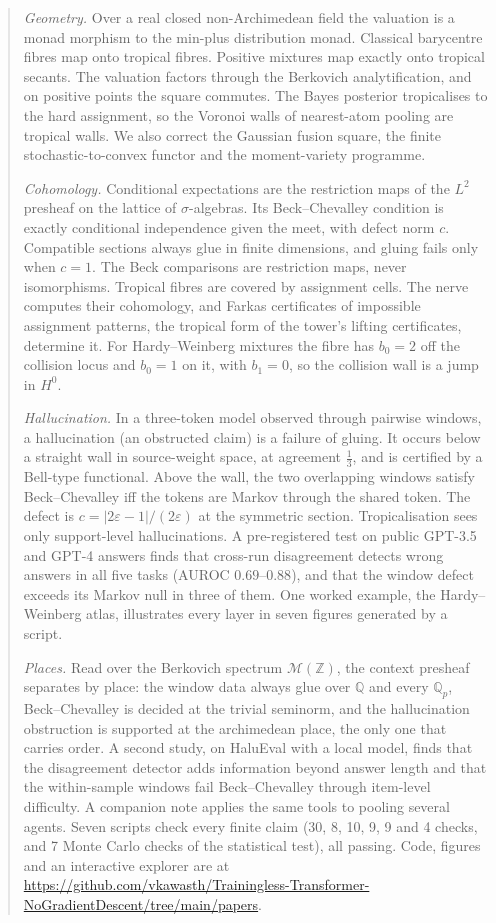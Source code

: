 \documentclass[11pt]{article}
\theoremstyle{definition}
\begin{document}
\begin{abstract}
\emph{Geometry.} Over a real closed non-Archimedean field the valuation is a monad morphism to the min-plus distribution monad.
Classical barycentre fibres map onto tropical fibres. Positive mixtures map exactly onto tropical secants. The valuation factors
through the Berkovich analytification, and on positive points the square commutes. The Bayes posterior tropicalises to the hard
assignment, so the Voronoi walls of nearest-atom pooling are tropical walls. We also correct the Gaussian fusion square, the finite
stochastic-to-convex functor and the moment-variety programme.

\emph{Cohomology.} Conditional expectations are the restriction maps of the $L^2$ presheaf on the lattice of $\sigma$-algebras. Its
Beck--Chevalley condition is exactly conditional independence given the meet, with defect norm $c$. Compatible sections always glue in
finite dimensions, and gluing fails only when $c=1$. The Beck comparisons are restriction maps, never isomorphisms. Tropical fibres
are covered by assignment cells. The nerve computes their cohomology, and Farkas certificates of impossible assignment patterns, the
tropical form of the tower's lifting certificates, determine it. For Hardy--Weinberg mixtures the fibre has $b_0=2$ off the
collision locus and $b_0=1$ on it, with $b_1=0$, so the collision wall is a jump in $H^0$.

\emph{Hallucination.} In a three-token model observed through pairwise windows, a hallucination (an obstructed claim) is a failure of
gluing. It occurs below a straight wall in source-weight space, at agreement $\tfrac13$, and is certified by a Bell-type functional.
Above the wall, the two overlapping windows satisfy Beck--Chevalley iff the tokens are Markov through the shared token. The defect is
$c=|2\varepsilon-1|/(2\varepsilon)$ at the symmetric section. Tropicalisation sees only support-level hallucinations. A pre-registered test on public GPT-3.5 and GPT-4 answers finds that
cross-run disagreement detects wrong answers in all five tasks (AUROC $0.69$--$0.88$), and that the window defect exceeds its Markov null
in three of them. One worked example, the Hardy--Weinberg
atlas, illustrates every layer in seven figures generated by a script.

\emph{Places.} Read over the Berkovich spectrum $\mathcal{M}(\mathbb{Z})$, the context presheaf separates by place: the window data
always glue over $\mathbb{Q}$ and every $\mathbb{Q}_p$, Beck--Chevalley is decided at the trivial seminorm, and the hallucination
obstruction is supported at the archimedean place, the only one that carries order. A second study, on HaluEval with a local model,
finds that the disagreement detector adds information beyond answer length and that the within-sample windows fail Beck--Chevalley
through item-level difficulty. A companion note applies the same tools to pooling several agents. Seven scripts check every finite claim (30, 8, 10, 9, 9 and 4 checks, and 7 Monte Carlo checks of the statistical test), all passing. Code, figures and an interactive explorer are at
\url{https://github.com/vkawasth/Trainingless-Transformer-NoGradientDescent/tree/main/papers}.
\end{abstract}
\end{document}
